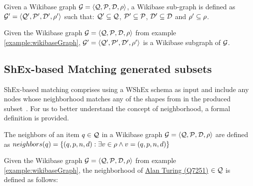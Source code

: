 \begin{definition}
    Given a Wikibase graph $\mathcal{G}=\langle\mathcal{Q},\mathcal{P},\mathcal{D},\rho\rangle$, a Wikibase sub-graph is defined as  $\mathcal{G}'=\langle\mathcal{Q}',\mathcal{P}',\mathcal{D}',\rho'\rangle$ such that: $\mathcal{Q}'\subseteq\mathcal{Q}$, $\mathcal{P}'\subseteq\mathcal{P}$, $\mathcal{D}'\subseteq\mathcal{D}$ and $\rho'\subseteq\rho$.
\end{definition}

\begin{example}
    Given the Wikibase graph $\mathcal{G}=\langle\mathcal{Q},\mathcal{P},\mathcal{D},\rho\rangle$ from example \ref{example:wikibaseGraph}, $\mathcal{G}'=\langle\mathcal{Q}',\mathcal{P}',\mathcal{D}',\rho'\rangle$ is a Wikibase subgraph of $\mathcal{G}$.
\end{example}

\begin{table}[ht]
    \centering
    
\end{table}

\subsection{ShEx-based Matching generated subsets}

ShEx-based matching comprises using a WShEx schema  as input and include any nodes whose neighborhood matches any of the shapes from  in the produced subset~\cite{https://doi.org/10.48550/arxiv.2110.11709}. For us to better understand the concept of neighborhood, a formal definition is provided.

\begin{definition}
    \label{definition:neighborhood}
    The neighbors of an item $q\in\mathcal{Q}$ in a Wikibase graph $\mathcal{G}=\langle\mathcal{Q},\mathcal{P},\mathcal{D},\rho\rangle$ are defined as $neighbors(q)=\{(q,p,n,d): \exists{}v\in\rho \wedge v=(q,p,n,d)\}$
\end{definition}

\begin{example}
    Given the Wikibase graph $\mathcal{G}=\langle\mathcal{Q},\mathcal{P},\mathcal{D},\rho\rangle$ from example \ref{example:wikibaseGraph}, the neighborhood of \href{https://www.wikidata.org/wiki/Q7251}{Alan Turing (Q7251)} $\in \mathcal{Q}$ is defined as follows:
\end{example}

\begin{table}[ht]
    \centering
    
\end{table}